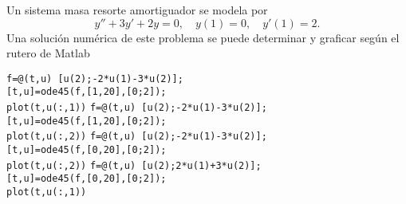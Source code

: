 \begin{pregunta}
\begin{cuerpo}
Un sistema masa resorte amortiguador se modela por
$$
y''+3y'+2y=0, \quad y(1)=0, \quad y'(1)=2.
$$
Una soluci\'on num\'erica de este problema se puede determinar y graficar seg\'un el rutero de Matlab
\end{cuerpo}

\begin{multicols}{2}
\begin{alternativas}
{
\texttt{f=@(t,u) [u(2);-2*u(1)-3*u(2)];}\\
\texttt{[t,u]=ode45(f,[1,20],[0;2]);}\\
\texttt{plot(t,u(:,1))}		}
{
\texttt{f=@(t,u) [u(2);-2*u(1)-3*u(2)];}\\
\texttt{[t,u]=ode45(f,[1,20],[0;2]);}\\
\texttt{plot(t,u(:,2))}		}
{
\texttt{f=@(t,u) [u(2);-2*u(1)-3*u(2)];}\\
\texttt{[t,u]=ode45(f,[0,20],[0;2]);}\\
\texttt{plot(t,u(:,2))}		}
{
\texttt{f=@(t,u) [u(2);2*u(1)+3*u(2)];}\\
\texttt{[t,u]=ode45(f,[0,20],[0;2]);}\\
\texttt{plot(t,u(:,1))}		}
\end{alternativas}
\end{multicols}
\justificacion{5cm}
\end{pregunta}